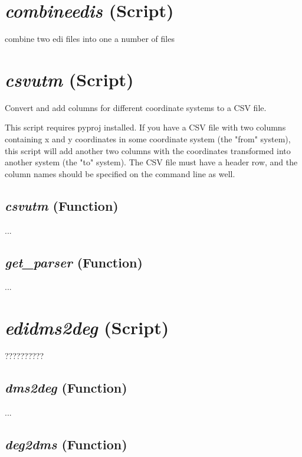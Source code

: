 \section{\textit{combineedis} (Script) }
\label{sec:utils.combineedis}

combine two edi files into one a number of files

\section{\textit{csvutm} (Script)}
\label{sec:utils.csvutm}

Convert and add columns for different coordinate systems to a CSV file.

This script requires pyproj installed. If you have a CSV file with two columns
containing x and y coordinates in some coordinate system (the "from" system),
this script will add another two columns with the coordinates transformed into
another system (the "to" system). The CSV file must have a header row, and
the column names should be specified on the command line as well.

\subsection{\textit{csvutm} (Function)}
\label{ssec:utils.csvutm.csvutm}

...

\subsection{\textit{get\_parser} (Function)}
\label{ssec:utils.csvutm.get_parser}


...




\section{\textit{edidms2deg} (Script)}
\label{sec:utils.edidms2deg}

??????????

\subsection{\textit{dms2deg} (Function)}
\label{ssec:utils.edidms2deg.dms2deg}

...

\subsection{\textit{deg2dms} (Function)}
\label{ssec:utils.edidms2deg.deg2dms}

